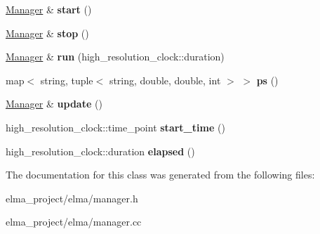 \begin{DoxyCompactItemize}
\mbox{\hyperlink{classelma_1_1_manager}{Manager}} \& {\bfseries start} ()
\item 
\mbox{\label{classelma_1_1_manager_af7e5060212d746c6376eae6551d200fd}} 
\mbox{\hyperlink{classelma_1_1_manager}{Manager}} \& {\bfseries stop} ()
\item 
\mbox{\label{classelma_1_1_manager_ad5df7316416ac9697d62e68e21f04758}} 
\mbox{\hyperlink{classelma_1_1_manager}{Manager}} \& {\bfseries run} (high\+\_\+resolution\+\_\+clock\+::duration)
\item 
\mbox{\label{classelma_1_1_manager_a57599c62785f313b35ceb44bab560993}} 
map$<$ string, tuple$<$ string, double, double, int $>$ $>$ {\bfseries ps} ()
\item 
\mbox{\label{classelma_1_1_manager_a16f0db2f3f19b6c6493735b4d25f55c8}} 
\mbox{\hyperlink{classelma_1_1_manager}{Manager}} \& {\bfseries update} ()
\item 
\mbox{\label{classelma_1_1_manager_af3bdf1e96abe8a4a24d8acdb4350ba3e}} 
high\+\_\+resolution\+\_\+clock\+::time\+\_\+point {\bfseries start\+\_\+time} ()
\item 
\mbox{\label{classelma_1_1_manager_ae6498164a8e790e474510f02618981d0}} 
high\+\_\+resolution\+\_\+clock\+::duration {\bfseries elapsed} ()
\end{DoxyCompactItemize}


The documentation for this class was generated from the following files\+:\begin{DoxyCompactItemize}
\item 
elma\+\_\+project/elma/manager.\+h\item 
elma\+\_\+project/elma/manager.\+cc\end{DoxyCompactItemize}
